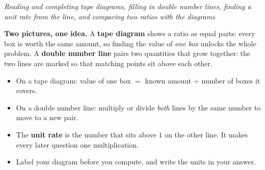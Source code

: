 \documentclass[12pt]{article}
\begin{document}

\begin{center}
\textit{Reading and completing tape diagrams, filling in double number lines,
finding a unit rate from the line, and comparing two ratios with the diagrams}
\end{center}

\noindent\small
\textbf{Two pictures, one idea.} A \textbf{tape diagram} shows a ratio as equal
parts: every box is worth the same amount, so finding the value of \emph{one
box} unlocks the whole problem. A \textbf{double number line} pairs two
quantities that grow together: the two lines are marked so that matching points
sit above each other.
\begin{itemize}[leftmargin=1.1cm, itemsep=1pt, topsep=2pt]
  \item On a tape diagram: value of one box $=$ known amount $\div$ number of
        boxes it covers.
  \item On a double number line: multiply or divide \emph{both} lines by the
        same number to move to a new pair.
  \item The \textbf{unit rate} is the number that sits above $1$ on the other
        line. It makes every later question one multiplication.
  \item Label your diagram before you compute, and write the units in your
        answer.
\end{itemize}
\normalsize

\vspace{0.15cm}

\end{document}
